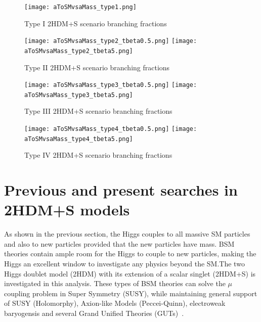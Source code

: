 \begin{figure}[ht!b]
  \centering
\texttt{[image: aToSMvsaMass\_type1.png]}           \\
    \caption{\label{fig:br2HDM-1} Type I 2HDM+S scenario branching fractions~\cite{Branco_2012}}
\end{figure}

\begin{figure}[ht!b]
  \centering
\texttt{[image: aToSMvsaMass\_type2\_tbeta0.5.png]}
\texttt{[image: aToSMvsaMass\_type2\_tbeta5.png]}           \\
    \caption{\label{fig:br2HDM-2} Type II 2HDM+S scenario branching fractions~\cite{Branco_2012}}
\end{figure}

\begin{figure}[ht!b]
  \centering
\texttt{[image: aToSMvsaMass\_type3\_tbeta0.5.png]}
\texttt{[image: aToSMvsaMass\_type3\_tbeta5.png]}           \\
    \caption{\label{fig:br2HDM-3} Type III 2HDM+S scenario branching fractions~\cite{Branco_2012}}
\end{figure}



\begin{figure}[ht!b]
  \centering
\texttt{[image: aToSMvsaMass\_type4\_tbeta0.5.png]}
\texttt{[image: aToSMvsaMass\_type4\_tbeta5.png]}           \\
    \caption{\label{fig:br2HDM-4} Type IV 2HDM+S scenario branching fractions~\cite{Branco_2012}}
\end{figure}

\section{Previous and present searches in 2HDM+S models}

As shown in the previous section, the Higgs couples to all massive SM particles and also to new particles provided that the new particles have mass.  
BSM theories contain ample room for the Higgs to couple to new particles, making the Higgs an excellent window to investigate any physics beyond the SM.The two Higgs doublet model (2HDM) with its extension of a scalar singlet (2HDM+S) is investigated in this analysis.
These types of BSM theories can solve the $\mu$ coupling problem in Super Symmetry (SUSY), while maintaining general support of SUSY (Holomorphy), Axion-like Models (Peccei-Quinn), electroweak baryogensis and several Grand Unified Theories (GUTs)~\cite{Branco_2012}.

